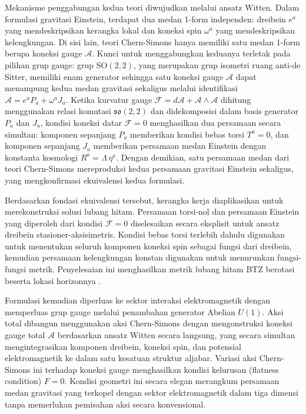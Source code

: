 Mekanisme penggabungan kedua teori diwujudkan melalui ansatz Witten. Dalam formulasi gravitasi Einstein, terdapat dua medan 1-form independen: dreibein $e^a$ yang mendeskripsikan kerangka lokal dan koneksi spin $\omega^a$ yang mendeskripsikan kelengkungan. Di sisi lain, teori Chern-Simons hanya memiliki satu medan 1-form berupa koneksi gauge $\mathcal{A}$. Kunci untuk menggabungkan keduanya terletak pada pilihan grup gauge: grup $\mathrm{SO}(2,2)$, yang merupakan grup isometri ruang anti-de Sitter, memiliki enam generator sehingga satu koneksi gauge $\mathcal{A}$ dapat menampung kedua medan gravitasi sekaligus melalui identifikasi $\mathcal{A} = e^a P_a + \omega^a J_a$. Ketika kurvatur gauge $\mathcal{F} = d\mathcal{A} + \mathcal{A} \wedge \mathcal{A}$ dihitung menggunakan relasi komutasi $\mathfrak{so}(2,2)$ dan didekomposisi dalam basis generator $P_a$ dan $J_a$, kondisi koneksi datar $\mathcal{F} = 0$ menghasilkan dua persamaan secara simultan: komponen sepanjang $P_a$ memberikan kondisi bebas torsi $T^a = 0$, dan komponen sepanjang $J_a$ memberikan persamaan medan Einstein dengan konstanta kosmologi $R^a = \Lambda\, \eta^a$. Dengan demikian, satu persamaan medan dari teori Chern-Simons mereproduksi kedua persamaan gravitasi Einstein sekaligus, yang mengkonfirmasi ekuivalensi kedua formulasi.

Berdasarkan fondasi ekuivalensi tersebut, kerangka kerja diaplikasikan untuk merekonstruksi solusi lubang hitam. Persamaan torsi-nol dan persamaan Einstein yang diperoleh dari kondisi $\mathcal{F} = 0$ diselesaikan secara eksplisit untuk ansatz dreibein stasioner-aksisimetris. Kondisi bebas torsi terlebih dahulu digunakan untuk menentukan seluruh komponen koneksi spin sebagai fungsi dari dreibein, kemudian persamaan kelengkungan konstan digunakan untuk menurunkan fungsi-fungsi metrik. Penyelesaian ini menghasilkan metrik lubang hitam BTZ berotasi beserta lokasi horizonnya \cite{banados1992, banados1993}.

Formulasi kemudian diperluas ke sektor interaksi elektromagnetik dengan memperluas grup gauge melalui penambahan generator Abelian $U(1)$. Aksi total dibangun menggunakan aksi Chern-Simons dengan mengonstruksi koneksi gauge total $\mathcal{A}$ berdasarkan ansatz Witten secara langsung, yang secara simultan mengintegrasikan komponen dreibein, koneksi spin, dan potensial elektromagnetik ke dalam satu kesatuan struktur aljabar. Variasi aksi Chern-Simons ini terhadap koneksi gauge menghasilkan kondisi kelurusan (flatness condition) $F = 0$. Kondisi geometri ini secara elegan merangkum persamaan medan gravitasi yang terkopel dengan sektor elektromagnetik dalam tiga dimensi tanpa memerlukan pemisahan aksi secara konvensional.

